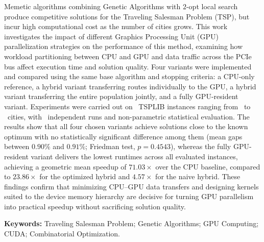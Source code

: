 \begin{resumo}[Abstract]\label{abstract}
      Memetic algorithms combining Genetic Algorithms with \(2\)-opt local search produce competitive solutions for the Traveling Salesman Problem (TSP), but incur high computational cost as the number of cities grows.
      This work investigates the impact of different Graphics Processing Unit (GPU) parallelization strategies on the performance of this method, examining how workload partitioning between CPU and GPU and data traffic across the PCIe bus affect execution time and solution quality.
      Four variants were implemented and compared using the same base algorithm and stopping criteria: a CPU-only reference, a hybrid variant transferring routes individually to the GPU, a hybrid variant transferring the entire population jointly, and a fully GPU-resident variant.
      Experiments were carried out on \totalinstancias\ TSPLIB instances ranging from \menorinstancia\ to \maiorinstancia\ cities, with \totalrepeticoes\ independent runs and non-parametric statistical evaluation.
      The results show that all four chosen variants achieve solutions close to the known optimum with no statistically significant difference among them (mean gaps between \(0.90\%\) and \(0.91\%\); Friedman test, \(p = 0.4543\)), whereas the fully GPU-resident variant delivers the lowest runtimes across all evaluated instances, achieving a geometric mean speedup of \(71.03\times\) over the CPU baseline, compared to \(23.86\times\) for the optimized hybrid and \(4.57\times\) for the naive hybrid.
      These findings confirm that minimizing CPU--GPU data transfers and designing kernels suited to the device memory hierarchy are decisive for turning GPU parallelism into practical speedup without sacrificing solution quality.

      \vspace{\onelineskip}
      \noindent\textbf{Keywords:} Traveling Salesman Problem; Genetic Algorithms; GPU Computing; CUDA; Combinatorial Optimization.
\end{resumo}

\listoffigures*
\clearpage

\listoftables*
\clearpage

\pretextualchapter{\listadesiglasname}\label{lista-de-siglas}

